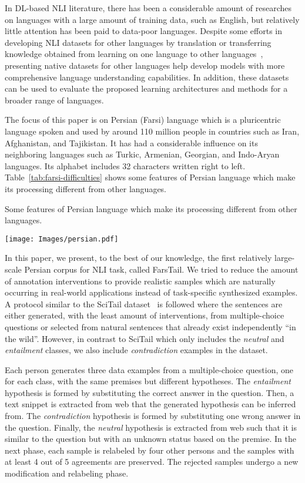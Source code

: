 \documentclass[preprint,12pt]{elsarticle}
\begin{document}
In DL-based NLI literature, there has been a considerable amount of researches on languages with a large amount of training data, such as English, but relatively little attention has been paid to data-poor languages. Despite some efforts in developing NLI datasets for other languages by translation or transferring knowledge obtained from learning on one language to other languages~\citep{conneau2018xnli}, presenting native datasets for other languages help develop models with more comprehensive language understanding capabilities. In addition, these datasets can be used to evaluate the proposed learning architectures and methods for a broader range of languages. 

The focus of this paper is on Persian (Farsi) language which is a pluricentric language spoken and used by around 110 million people in countries such as Iran, Afghanistan, and Tajikistan. It has had a considerable influence on its neighboring languages such as Turkic, Armenian, Georgian, and Indo-Aryan languages. Its alphabet includes 32 characters written right to left. Table~\ref{tab:farsi-difficulties} shows some features of Persian language which make its processing different from other languages.

\begin{table}[!t]
\caption{Some features of Persian language which make its processing different from other languages.}
    \label{tab:farsi-difficulties}
    \centering
    \texttt{[image: Images/persian.pdf]}


\end{table}

In this paper, we present, to the best of our knowledge, the first relatively large-scale Persian corpus for NLI task, called FarsTail. We tried to reduce the amount of annotation interventions to provide realistic samples which are naturally occurring in real-world applications instead of task-specific synthesized examples. A protocol similar to the SciTail dataset~\citep{khot2018scitail} is followed where the sentences are either generated, with the least amount of interventions, from multiple-choice questions or selected from natural sentences that already exist independently “in the wild”. However, in contrast to SciTail which only includes the \textit{neutral} and \textit{entailment} classes, we also include \textit{contradiction} examples in the dataset.  



Each person generates three data examples from a multiple-choice question, one for each class, with the same premises but different hypotheses. The \textit{entailment} hypothesis is formed by substituting the correct answer in the question. Then, a text snippet is extracted from web that the generated hypothesis can be inferred from. The \textit{contradiction} hypothesis is formed by substituting one wrong answer in the question. Finally, the \textit{neutral} hypothesis is extracted from web such that it is similar to the question but with an unknown status based on the premise. In the next phase, each sample is relabeled by four other persons and the samples with at least 4 out of 5 agreements are preserved. The rejected samples undergo a new modification and relabeling phase. 
\end{document}
